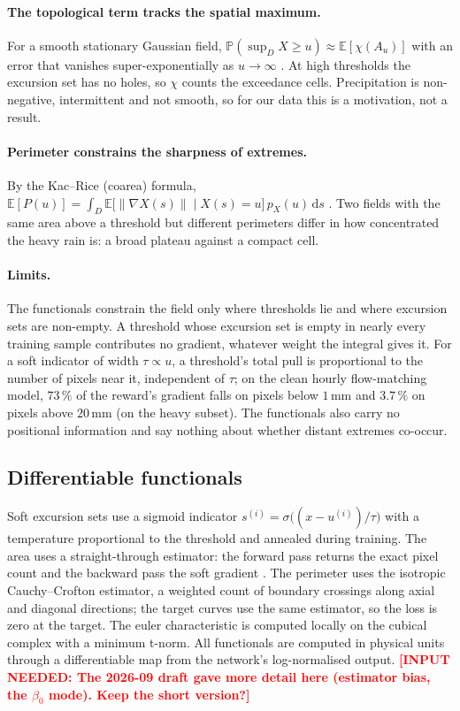 \documentclass{article}
\newcommand{\needinput}[1]{\textcolor{red}{\textbf{[INPUT NEEDED: #1]}}}
\begin{document}
\paragraph{The topological term tracks the spatial maximum.} For a smooth stationary Gaussian field,
$\mathbb{P}(\sup_D X \ge u) \approx \mathbb{E}[\chi(A_u)]$ with an error that vanishes super-exponentially as
$u \to \infty$ \citep{taylor2005validity, adler2007random}. At high thresholds the excursion set has no holes, so
$\chi$ counts the exceedance cells. Precipitation is non-negative, intermittent and not smooth, so for our data this
is a motivation, not a result.

\paragraph{Perimeter constrains the sharpness of extremes.} By the Kac--Rice (coarea) formula, $\mathbb{E}[P(u)] =
\int_D \mathbb{E}\bigl[\lVert \nabla X(s) \rVert \mid X(s) = u\bigr]\,p_X(u)\,\mathrm{d}s$ \citep{adler2007random}.
Two fields with the same area above a threshold but different perimeters differ in how concentrated the heavy rain
is: a broad plateau against a compact cell.

\paragraph{Limits.} The functionals constrain the field only where thresholds lie and where excursion sets are
non-empty. A threshold whose excursion set is empty in nearly every training sample contributes no gradient,
whatever weight the integral gives it. For a soft indicator of width $\tau \propto u$, a threshold's total pull is
proportional to the number of pixels near it, independent of $\tau$; on the clean hourly flow-matching model, $73\,\%$
of the reward's gradient falls on pixels below $1\,\mathrm{mm}$ and $3.7\,\%$ on pixels above $20\,\mathrm{mm}$ (on
the heavy subset). The functionals also carry no positional information and say nothing about whether distant
extremes co-occur.

\subsection{Differentiable functionals}
\label{sec:analytical}
Soft excursion sets use a sigmoid indicator $s^{(i)} = \sigma\big((x - u^{(i)})/\tau\big)$ with a temperature
proportional to the threshold and annealed during training. The area uses a straight-through estimator: the forward
pass returns the exact pixel count and the backward pass the soft gradient \citep{bengio2013ste}. The perimeter uses
the isotropic Cauchy--Crofton estimator, a weighted count of boundary crossings along axial and diagonal directions;
the target curves use the same estimator, so the loss is zero at the target. The euler characteristic is computed
locally on the cubical complex with a minimum t-norm. All functionals are computed in physical units through a
differentiable map from the network's log-normalised output. \needinput{The 2026-09 draft gave more detail here
(estimator bias, the $\beta_0$ mode). Keep the short version?}
\end{document}
